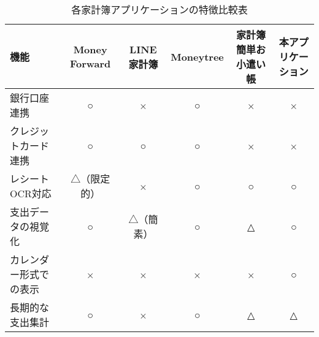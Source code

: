 \documentclass[main]{subfiles}
\begin{document}
\begin{table}[tbp]
    \centering
    \caption{各家計簿アプリケーションの特徴比較表}
    \label{tab:featureComparisonKakeibo}
    \small
    \begin{tabular}{|l|c|c|c|c|c|}
        \hline
        {機能} & {Money Forward} & {LINE家計簿} & {Moneytree} & {家計簿 簡単お小遣い帳} & {本アプリケーション} \\
        \hline
        銀行口座連携 & ○ & × & ○ & × & × \\
        \hline
        クレジットカード連携 & ○ & ○ & ○ & × & × \\
        \hline
        レシートOCR対応 & △（限定的） & × & ○ & ○ & ○ \\
        \hline
        支出データの視覚化 & ○ & △（簡素） & ○ & △ & ○ \\
        \hline
        カレンダー形式での表示 & × & × & × & × & ○ \\
        \hline
        長期的な支出集計 & ○ & × & ○ & △ & △ \\
        \hline
    \end{tabular}
\end{table}
\end{document}
